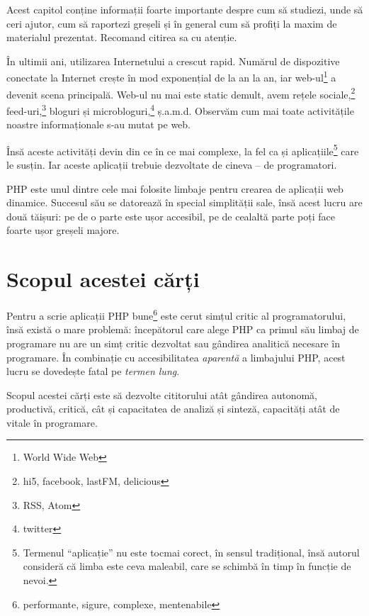 
\begin{chapsummary}

Acest capitol conține informații foarte importante despre cum să studiezi, unde
să ceri ajutor, cum să raportezi greșeli și în general cum să profiți la maxim
de materialul prezentat. Recomand citirea sa cu atenție.

\end{chapsummary}

În ultimii ani, utilizarea Internetului a crescut rapid. Numărul de dispozitive
conectate la Internet crește în mod exponențial de la an la an, iar
web-ul\footnote{World Wide Web} a devenit scena principală. Web-ul nu mai este
static demult, avem rețele sociale,\footnote{hi5, facebook, lastFM, delicious}
feed-uri,\footnote{RSS, Atom} bloguri și microbloguri,\footnote{twitter}
ș.a.m.d. Observăm cum mai toate activitățile noastre informaționale s-au mutat
pe web.

Însă aceste activități devin din ce în ce mai complexe, la fel ca și
aplicațiile\footnote{Termenul ``aplicație'' nu este tocmai corect, în sensul
tradițional, însă autorul consideră că limba este ceva maleabil, care se
schimbă în timp în funcție de nevoi.} care le susțin.  Iar aceste aplicații
trebuie dezvoltate de cineva -- de programatori.

PHP este unul dintre cele mai folosite limbaje pentru crearea de aplicații web
dinamice. Succesul său se datorează în special simplității sale, însă acest
lucru are două tăișuri: pe de o parte este ușor accesibil, pe de cealaltă parte
poți face foarte ușor greșeli majore.

\section*{Scopul acestei cărți}
{}

Pentru a scrie aplicații PHP bune\footnote{performante, sigure, complexe,
mentenabile} este cerut simțul critic al programatorului, însă există o mare
problemă: începătorul care alege PHP ca primul său limbaj de programare nu are
un simț critic dezvoltat sau gândirea analitică necesare în programare. În
combinație cu accesibilitatea \textit{aparentă} a limbajului PHP, acest lucru
se dovedește fatal pe \textit{termen lung}.

Scopul acestei cărți este să dezvolte cititorului atât gândirea autonomă,
productivă, critică, cât și capacitatea de analiză și sinteză, capacități atât
de vitale în programare.

